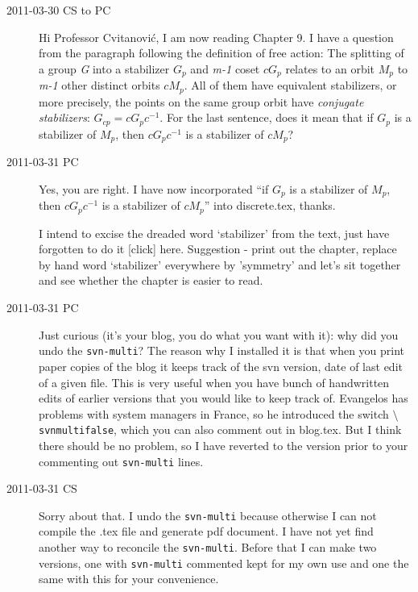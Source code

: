 \begin{description}
\item[2011-03-30  CS to PC]
    Hi Professor Cvitanovi\'c, I am now reading Chapter 9. I have a question from the paragraph following the
   definition of free action: The splitting of a group \emph{G} into a stabilizer \emph{$G_{p}$} and \emph{m-1} coset
   \emph{$cG_{p}$} relates to an orbit \emph{$M_{p}$} to \emph{m-1}
   other distinct orbits \emph{$cM_{p}$}. All of them have equivalent stabilizers,
   or more precisely, the points on the same group orbit have
\emph{conjugate stabilizers}: \emph{$G_{cp} = cG_{p}c^{-1}$}.
   For the last sentence, does it mean that
   if \emph{$G_{p}$}  is a stabilizer of \emph{$M_{p}$},
   then \emph{$cG_{p}c^{-1}$} is a stabilizer of \emph{$cM_{p}$}?

\item[2011-03-31 PC] Yes, you are right. I have now incorporated ``if \emph{$G_{p}$}  is a stabilizer of \emph{$M_{p}$},
   then \emph{$cG_{p}c^{-1}$} is a stabilizer of \emph{$cM_{p}$}''
into discrete.tex, thanks.

I intend to excise the dreaded word
`stabilizer' from the text, just have forgotten to do it
{[click]} here. Suggestion - print out the chapter, replace by hand
word `stabilizer' everywhere by 'symmetry' and let's sit together and
see whether the chapter is  easier to read.

\item[2011-03-31 PC] Just curious (it's your blog, you do what you want with it):
    why did you undo the \texttt{svn-multi}? The reason why I
    installed it is that when you print paper copies of the blog
    it keeps track of the svn version, date of last edit of a given
    file. This is very useful when you have bunch of handwritten edits
    of earlier versions that you would like to keep track of.
    Evangelos has problems with system managers in France, so he
    introduced the switch \texttt{$\setminus$svnmultifalse}, which
    you can also comment out in blog.tex. But I think there should
    be no problem, so I have reverted to the version prior to your commenting out
    \texttt{svn-multi} lines.

\item[2011-03-31 CS] Sorry about that. I undo the \texttt{svn-multi}
because otherwise I can not compile the .tex file and generate pdf
document. I have not yet find another way to reconcile the
\texttt{svn-multi}. Before that I can make two versions, one with
\texttt{svn-multi} commented kept for my own use and one the same with
this for your convenience.


\end{description}
